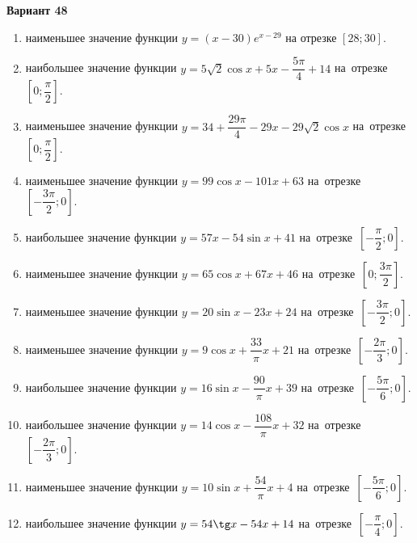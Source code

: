 \documentclass[a4paper,10pt]{article}
\begin{document}
\begin{center}\Large\textbf{Вариант 48}\end{center}

\begin{enumerate}
\item {} наименьшее значение функции $y = \left(x-30\right)e^{x-29}$ на отрезке $\left[28;30\right]$.

\item {} наибольшее значение функции $y = 5\sqrt{2}\cos x+5x-\dfrac{5\pi}{4} +14$ на~отрезке~$\left[0;\dfrac{\pi }{2}\right]$.

\item {} наименьшее значение функции $y = 34+\dfrac{29 \pi}{4}-29x-29\sqrt{2}\cos x$ на~отрезке~$\left[0;\dfrac{\pi }{2}\right]$.

\item {} наименьшее значение функции $y = 99\cos x-101x+63$ на~отрезке~$\left[-\dfrac{3\pi }{2};0\right]$.

\item {} наибольшее значение функции $y = 57x-54\sin x+41$ на~отрезке~$\left[-\dfrac{\pi }{2};0\right]$.

\item {} наименьшее значение функции $y = 65\cos x+67x+46$ на~отрезке~$\left[0;\dfrac{3\pi }{2}\right]$.

\item {} наименьшее значение функции $y = 20\sin x-23x+24$ на~отрезке~$\left[-\dfrac{3\pi }{2};0\right]$.

\item {} наименьшее значение функции $y = 9\cos x+\dfrac{33}{\pi }x +21$ на~отрезке~$\left[-\dfrac{2\pi }{3};0\right]$.

\item {} наибольшее значение функции $y = 16\sin x-\dfrac{90}{\pi }x+39$ на~отрезке~$\left[-\dfrac{5\pi }{6};0\right]$.

\item {} наибольшее значение функции $y = 14\cos x-\dfrac{108}{\pi }x+32$ на~отрезке~$\left[-\dfrac{2\pi }{3};0\right]$.

\item {} наименьшее значение функции $y = 10\sin x+\dfrac{54}{\pi }x+4$ на~отрезке~$\left[-\dfrac{5\pi }{6};0\right]$.

\item {} наибольшее значение функции $y = 54\tg x-54x+14$ на~отрезке~$\left[-\dfrac{\pi }{4};0\right]$.


\end{enumerate}
\end{document}
